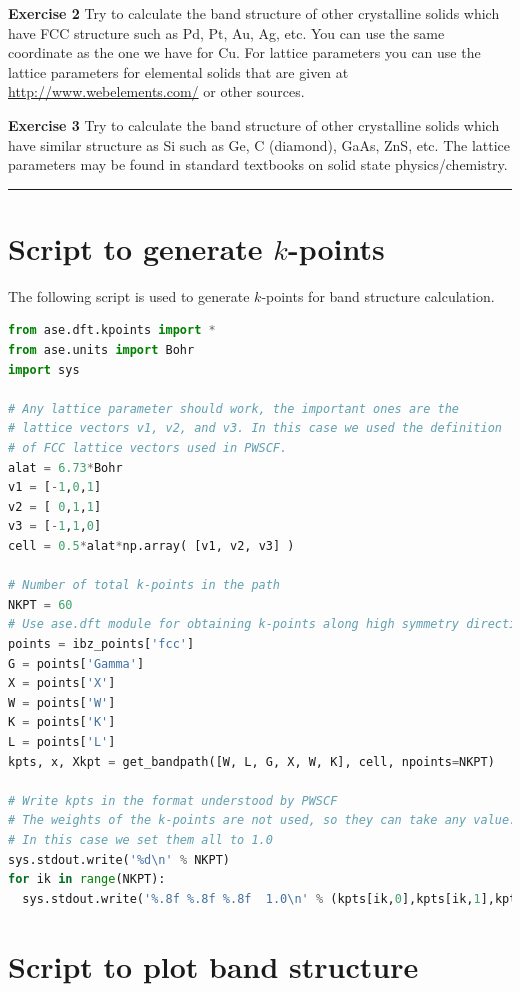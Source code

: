\documentclass[12pt,english]{paper}
\begin{document}
\textbf{Exercise 2} Try to calculate the band structure of other crystalline
solids which have FCC structure such as Pd, Pt, Au, Ag, etc. You can
use the same coordinate as the one we have for Cu. For lattice parameters
you can use the lattice parameters for elemental solids that are given
at \url{http://www.webelements.com/} or other sources.

\textbf{Exercise 3} Try to calculate the band structure of other crystalline
solids which have similar structure as Si such as Ge, C (diamond),
GaAs, ZnS, etc. The lattice parameters may be found in standard textbooks
on solid state physics/chemistry.

\rule[0.5ex]{1\columnwidth}{1pt}

\appendix

\section{\label{sec:k-gen-script}Script to generate $k$-points}

The following script is used to generate $k$-points for band structure
calculation.

\begin{lstlisting}[breaklines=true,language=Python,showstringspaces=false,tabsize=2]
from ase.dft.kpoints import *
from ase.units import Bohr
import sys

# Any lattice parameter should work, the important ones are the
# lattice vectors v1, v2, and v3. In this case we used the definition
# of FCC lattice vectors used in PWSCF.
alat = 6.73*Bohr
v1 = [-1,0,1]
v2 = [ 0,1,1]
v3 = [-1,1,0]
cell = 0.5*alat*np.array( [v1, v2, v3] )

# Number of total k-points in the path
NKPT = 60
# Use ase.dft module for obtaining k-points along high symmetry directions
points = ibz_points['fcc']
G = points['Gamma']
X = points['X']
W = points['W']
K = points['K']
L = points['L']
kpts, x, Xkpt = get_bandpath([W, L, G, X, W, K], cell, npoints=NKPT)

# Write kpts in the format understood by PWSCF
# The weights of the k-points are not used, so they can take any value.
# In this case we set them all to 1.0
sys.stdout.write('%d\n' % NKPT)
for ik in range(NKPT):
  sys.stdout.write('%.8f %.8f %.8f  1.0\n' % (kpts[ik,0],kpts[ik,1],kpts[ik,2]))
\end{lstlisting}



\section{\label{sec:plot-band-script}Script to plot band structure}
\end{document}
